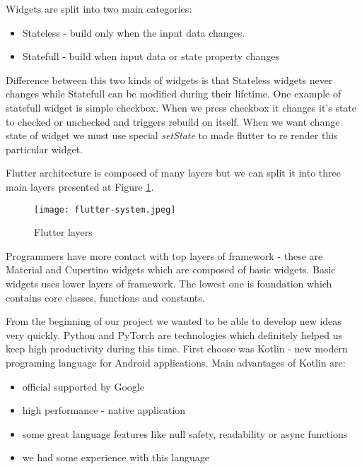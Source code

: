 \documentclass[../Main.tex]{subfiles}
\begin{document}
        
        Widgets are split into two main categories:
        \begin{itemize}
             \item Stateless - build only when the input data changes. 
             \item Statefull - build when input data or state property changes 
        \end{itemize}
        Difference between this two kinds of widgets is that Stateless widgets 
        never changes while Statefull can be modified during their lifetime.
        One example of statefull widget is simple checkbox. When we press checkbox
        it changes it's state to checked or unchecked and triggers rebuild on itself.
        When we want change state of widget we must use special 
        \textit{setState} to made flutter to re render this particular widget.
    
        
        Flutter architecture is composed of many layers but we can split it into 
        three main layers presented at Figure \ref{fig:flutter-layers}.
        \begin{figure}[h]
            \centering
            \texttt{[image: flutter-system.jpeg]}
            \caption{Flutter layers}
            \label{fig:flutter-layers}
        \end{figure}
        Programmers have more contact with top layers of framework - 
        these are Material and Cupertino widgets which are composed of basic widgets.
        Basic widgets uses lower layers of framework. 
        The lowest one is foundation which contains core classes, functions and constants.
    
    
        From the beginning of our project we wanted to be able to develop new ideas
        very quickly.
        Python and PyTorch are technologies which definitely helped us keep high
        productivity during this time. First choose was Kotlin - new modern programing 
        language for Android applications. Main advantages of Kotlin are:
            \begin{itemize}
                \item official supported by Google
                \item high performance - native application
                \item some great language features like null safety, readability or async functions
                \item we had some experience with this language
            \end{itemize}
            
\end{document}
